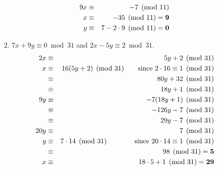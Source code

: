 \documentclass[11pt,fleqn]{article}
\begin{document}
\begin{enumerate}
\begin{enumerate}
\begin{eqnarray*}
9x & \equiv & -7 \pmod{11} \\
x & \equiv & -35 \pmod{11} = {\bf 9} \\
y & \equiv & 7-2\cdot9 \pmod{11} = {\bf 0}
\end{eqnarray*}
\item $7x + 9y \equiv 0 \bmod 31$ and $2x -5y \equiv 2 \bmod 31$.
\begin{eqnarray*}
2x & \equiv & 5y+2 \pmod{31} \\
 x & \equiv & 16(5y+2) \pmod{31} \qquad \text{since } 2\cdot16 \equiv 1 \pmod{31} \\
   & \equiv & 80y+32 \pmod{31} \\
   & \equiv & 18y+1 \pmod{31} \\
9y & \equiv & -7(18y+1) \pmod{31} \\
   & \equiv & -126y-7 \pmod{31} \\
   & \equiv & 29y-7 \pmod{31} \\
20y & \equiv & 7 \pmod{31} \\
 y & \equiv & 7\cdot14 \pmod{31} \qquad \qquad \text{since } 20\cdot14 \equiv 1 \pmod{31} \\
   & \equiv & 98 \pmod{31} = {\bf 5} \\
 x & \equiv & 18\cdot5 + 1 \pmod{31} = {\bf 29}
\end{eqnarray*}
\end{enumerate}


\end{enumerate}
\end{document}
